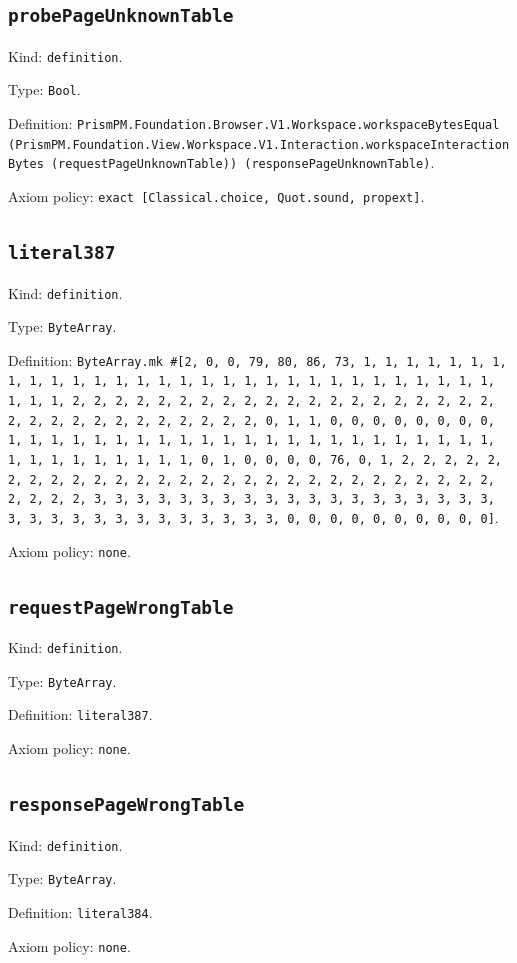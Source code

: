 \documentclass[11pt]{article}
\begin{document}
\subsection*{\texttt{probePageUnknownTable}}
\noindent Kind: \texttt{definition}.\par
\noindent Type: \texttt{Bool}.\par
\noindent Definition: \texttt{PrismPM.Foundation.Browser.V1.Workspace.workspaceBytesEqual (PrismPM.Foundation.View.Workspace.V1.Interaction.workspaceInteractionBytes (requestPageUnknownTable)) (responsePageUnknownTable)}.\par
\noindent Axiom policy: \texttt{exact [Classical.choice, Quot.sound, propext]}.\par
\subsection*{\texttt{literal387}}
\noindent Kind: \texttt{definition}.\par
\noindent Type: \texttt{ByteArray}.\par
\noindent Definition: \texttt{ByteArray.mk \#[2, 0, 0, 79, 80, 86, 73, 1, 1, 1, 1, 1, 1, 1, 1, 1, 1, 1, 1, 1, 1, 1, 1, 1, 1, 1, 1, 1, 1, 1, 1, 1, 1, 1, 1, 1, 1, 1, 1, 1, 2, 2, 2, 2, 2, 2, 2, 2, 2, 2, 2, 2, 2, 2, 2, 2, 2, 2, 2, 2, 2, 2, 2, 2, 2, 2, 2, 2, 2, 2, 2, 2, 0, 1, 1, 0, 0, 0, 0, 0, 0, 0, 0, 1, 1, 1, 1, 1, 1, 1, 1, 1, 1, 1, 1, 1, 1, 1, 1, 1, 1, 1, 1, 1, 1, 1, 1, 1, 1, 1, 1, 1, 1, 1, 1, 0, 1, 0, 0, 0, 0, 76, 0, 1, 2, 2, 2, 2, 2, 2, 2, 2, 2, 2, 2, 2, 2, 2, 2, 2, 2, 2, 2, 2, 2, 2, 2, 2, 2, 2, 2, 2, 2, 2, 2, 2, 3, 3, 3, 3, 3, 3, 3, 3, 3, 3, 3, 3, 3, 3, 3, 3, 3, 3, 3, 3, 3, 3, 3, 3, 3, 3, 3, 3, 3, 3, 3, 3, 0, 0, 0, 0, 0, 0, 0, 0, 0, 0]}.\par
\noindent Axiom policy: \texttt{none}.\par
\subsection*{\texttt{requestPageWrongTable}}
\noindent Kind: \texttt{definition}.\par
\noindent Type: \texttt{ByteArray}.\par
\noindent Definition: \texttt{literal387}.\par
\noindent Axiom policy: \texttt{none}.\par
\subsection*{\texttt{responsePageWrongTable}}
\noindent Kind: \texttt{definition}.\par
\noindent Type: \texttt{ByteArray}.\par
\noindent Definition: \texttt{literal384}.\par
\noindent Axiom policy: \texttt{none}.\par
\end{document}
